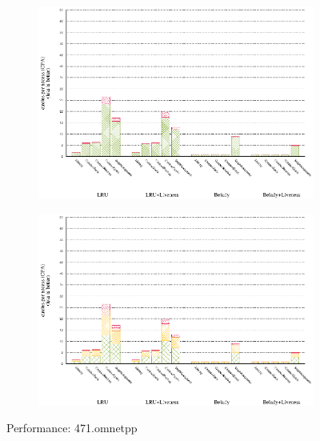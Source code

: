 \documentclass[onecolumn, openright, master, english, signatures]{dbrgrptt}
\begin{document}
\begin{figure}[!ht]
  \begin{subfigure}[b]{0.5\textwidth}%
    \includegraphics[width=\textwidth]{figs/plots/perf-misses-471-omnetpp.eps}
    \label{fig:performance-471-omnetpp-misses}
  \end{subfigure}%
  \begin{subfigure}[b]{0.5\textwidth}%
    \includegraphics[width=\textwidth]{figs/plots/perf-471-omnetpp.eps}
    \label{fig:performance-471-omnetpp-memops}
  \end{subfigure}%
  \caption{Performance: 471.omnetpp}
  \label{fig:performance-471-omnetpp}
\end{figure}
\end{document}
